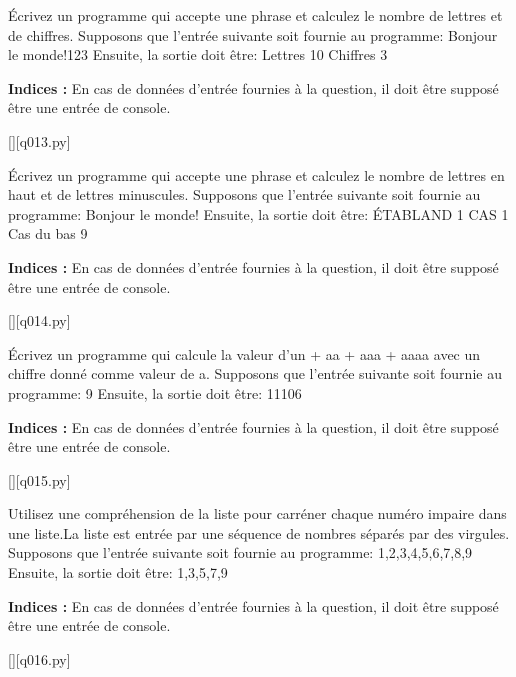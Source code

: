 \question
Écrivez un programme qui accepte une phrase et calculez le nombre de lettres et de chiffres.
Supposons que l'entrée suivante soit fournie au programme:
Bonjour le monde!123
Ensuite, la sortie doit être:
Lettres 10
Chiffres 3
\par
\textbf{Indices : }En cas de données d'entrée fournies à la question, il doit être supposé être une entrée de console.
\renewcommand{\nomfichier}{q013.py}
\begin{solution}
    \pythonfile{\chemincode \nomfichier}[][q013.py]
\end{solution}


\question
Écrivez un programme qui accepte une phrase et calculez le nombre de lettres en haut et de lettres minuscules.
Supposons que l'entrée suivante soit fournie au programme:
Bonjour le monde!
Ensuite, la sortie doit être:
ÉTABLAND 1 CAS 1
Cas du bas 9
\par
\textbf{Indices : }En cas de données d'entrée fournies à la question, il doit être supposé être une entrée de console.
\renewcommand{\nomfichier}{q014.py}
\begin{solution}
    \pythonfile{\chemincode \nomfichier}[][q014.py]
\end{solution}


\question
Écrivez un programme qui calcule la valeur d'un + aa + aaa + aaaa avec un chiffre donné comme valeur de a.
Supposons que l'entrée suivante soit fournie au programme:
9
Ensuite, la sortie doit être:
11106
\par
\textbf{Indices : }En cas de données d'entrée fournies à la question, il doit être supposé être une entrée de console.
\renewcommand{\nomfichier}{q015.py}
\begin{solution}
    \pythonfile{\chemincode \nomfichier}[][q015.py]
\end{solution}


\question
Utilisez une compréhension de la liste pour carréner chaque numéro impaire dans une liste.La liste est entrée par une séquence de nombres séparés par des virgules.
Supposons que l'entrée suivante soit fournie au programme:
1,2,3,4,5,6,7,8,9
Ensuite, la sortie doit être:
1,3,5,7,9
\par
\textbf{Indices : }En cas de données d'entrée fournies à la question, il doit être supposé être une entrée de console.
\renewcommand{\nomfichier}{q016.py}
\begin{solution}
    \pythonfile{\chemincode \nomfichier}[][q016.py]
\end{solution}


